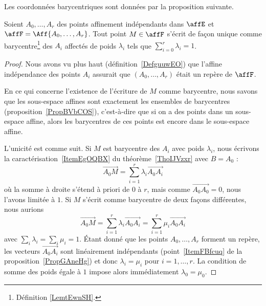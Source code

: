 Les coordonnées barycentriques sont données par la proposition suivante.
\begin{proposition}      \label{PROPooTIRXooLAipRa}
	Soient \( A_0,\ldots, A_r\) des points affinement indépendants dans \( \affE\) et \( \affF=\Aff\{ A_0,\ldots, A_r \}\). Tout point \( M\in\affF\) s'écrit de façon unique comme barycentre\footnote{Définition \ref{LemtEwnSH}.} des \( A_i\) affectés de poids \( \lambda_i\) tels que \( \sum_{i=0}^r\lambda_i=1\).
\end{proposition}

\begin{proof}
	Nous avons vu plus haut (définition~\ref{DefguuwEO}) que l'affine indépendance des points \( A_i\) assurait que \( (A_0,\ldots, A_r)\) était un repère de \( \affF\).

	En ce qui concerne l'existence de l'écriture de \( M\) comme barycentre, nous savons que les sous-espace affines sont exactement les ensembles de barycentres (proposition~\ref{PropBVbCOS}), c'est-à-dire que si on a des points dans un sous-espace affine, alors les barycentres de ces points est encore dans le sous-espace affine.

	L'unicité est comme suit. Si \( M\) est barycentre des \( A_i\) avec poids \( \lambda_i\), nous écrivons la caractérisation~\ref{ItemEgOQBX} du théorème~\ref{ThoIJVzxr} avec \( B=A_0\) :
	\begin{equation}
		\overrightarrow{ A_0M }=\sum_{i=1}^r\lambda_i\overrightarrow{ A_0A_i }
	\end{equation}
	où la somme à droite s'étend à priori de \( 0\) à \( r\), mais comme \( \overrightarrow{ A_0A_0 }=0\), nous l'avons limitée à \( 1\). Si \( M\) s'écrit comme barycentre de deux façons différentes, nous aurions
	\begin{equation}
		\overrightarrow{ A_0M }=\sum_{i=1}^r\lambda_i\overrightarrow{ A_0A_i }=\sum_{i=1}^r\mu_i\overrightarrow{ A_0A_i }
	\end{equation}
	avec \( \sum_i\lambda_i=\sum_i\mu_i=1\). Étant donné que les points \( A_0,\ldots, A_r\) forment un repère, les vecteurs \( \overrightarrow{ A_0A_i }\) sont linéairement indépendants (point~\ref{ItemFBfcuq} de la proposition~\ref{PropGAneHg}) et donc \( \lambda_i=\mu_i\) pour \( i=1,\ldots, r\). La condition de somme des poids égale à \( 1\) impose alors immédiatement \( \lambda_0=\mu_0\).
\end{proof}

